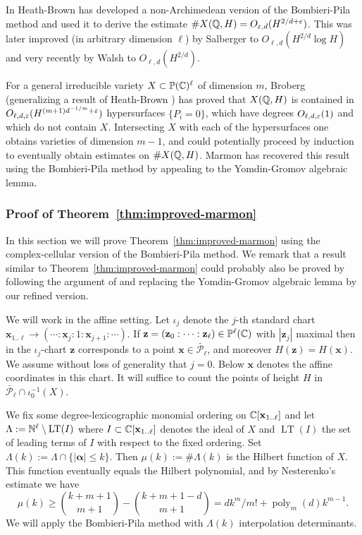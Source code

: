 \documentclass[reqno]{amsart}
\renewcommand\ge{\geqslant} \renewcommand\le{\leqslant}
\renewcommand\~[1]{\widetilde{#1}}
\def\poly{\operatorname{poly}} \def\J{\operatorname{J}}
\def\cP{{\mathcal P}} \def\cR{{\mathcal R}}
\def\LT{\operatorname{LT}}
\def\vx{{\mathbf x}}
\def\vz{{\mathbf z}}
\def\valpha{{\boldsymbol\alpha}}
\begin{document}
In \cite{heath-brown:density} Heath-Brown has developed a
non-Archimedean version of the Bombieri-Pila method and used it to
derive the estimate $\#X({\mathbb Q},H)=O_{\varepsilon,d}(H^{2/d+\varepsilon})$. This was later
improved (in arbitrary dimension $\ell$) by Salberger
\cite{salberger:density} to $O_{\ell,d}(H^{2/d}\log H)$ and very
recently by Walsh \cite{walsh:boundd-rational} to
$O_{\ell,d}(H^{2/d})$.

For a general irreducible variety $X\subset{\mathbb P}({\mathbb C})^\ell$ of dimension
$m$, Broberg \cite[Theorem~1]{broberg:note} (generalizing a result of
Heath-Brown \cite{heath-brown:density}) has proved that $X({\mathbb Q},H)$ is
contained in $O_{\ell,d,\varepsilon}(H^{(m+1)d^{-1/m}+\varepsilon})$ hypersurfaces
$\{P_i=0\}$, which have degrees $O_{\ell,d,\varepsilon}(1)$ and which do not
contain $X$. Intersecting $X$ with each of the hypersurfaces one
obtains varieties of dimension $m-1$, and could potentially proceed by
induction to eventually obtain estimates on $\#X({\mathbb Q},H)$. Marmon
\cite{marmon} has recovered this result using the Bombieri-Pila method
by appealing to the Yomdin-Gromov algebraic lemma.

\subsubsection{Proof of Theorem~\ref{thm:improved-marmon}}
\label{sec:alg-density-proof}

In this section we will prove Theorem~\ref{thm:improved-marmon} using
the complex-cellular version of the Bombieri-Pila method. We remark
that a result similar to Theorem~\ref{thm:improved-marmon} could
probably also be proved by following the argument of \cite{marmon} and
replacing the Yomdin-Gromov algebraic lemma by our refined
version.

We will work in the affine setting. Let $\iota_j$ denote the $j$-th
standard chart $\vx_{1..\ell}\to(\cdots:\vx_j:1:\vx_{j+1}:\cdots)$. If
$\vz=(\vz_0:\cdots:\vz_{\ell})\in\P^\ell(\C)$ with $|\vz_j|$ maximal
then in the $\iota_j$-chart $\vz$ corresponds to a point
$\vx\in\bar\cP_\ell$, and moreover $H(\vz)=H(\vx)$. We assume without
loss of generality that $j=0$. Below $\vx$ denotes the affine
coordinates in this chart. It will suffice to count the points of
height $H$ in $\bar\cP_\ell\cap\iota_0^{-1}(X)$.

We fix some degree-lexicographic monomial ordering on
$\C[\vx_{1..\ell}]$ and let $\Lambda:=\N^\ell\setminus\LT(I)$ where
$I\subset\C[\vx_{1..\ell}]$ denotes the ideal of $X$ and $\LT(I)$ the
set of leading terms of $I$ with respect to the fixed ordering. Set
$\Lambda(k):=\Lambda\cap\{|\valpha|\le k\}$. Then
$\mu(k):=\#\Lambda(k)$ is the Hilbert function of $X$. This function
eventually equals the Hilbert polynomial, and by Nesterenko's estimate
\cite{nesterenko:hilbert} we have
\begin{equation}
  \mu(k) \ge \binom{k+m+1}{m+1} - \binom{k+m+1-d}{m+1} = dk^m/m!+\poly_m(d)k^{m-1}.
\end{equation}
We will apply the Bombieri-Pila method with $\Lambda(k)$ interpolation
determinants.
\end{document}
